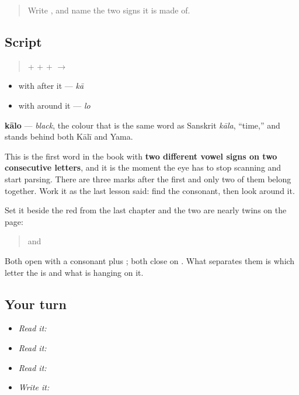 \label{lesson:BN-W03-kalo-read}



\begin{quote}
Write \textbf{}, and name the two signs it is made of.
\end{quote}

\subsection*{Script}
\begin{quote}
\textbf{} + \textbf{} + \textbf{} + \textbf{} $\to$ \textbf{}
\end{quote}

\begin{itemize}
\raggedright
  \item \textbf{} with \textbf{} after it — \emph{kā}
  \item \textbf{} with \textbf{} around it — \emph{lo}
\end{itemize}

\textbf{kālo} — \emph{black}, the colour that is the same word as Sanskrit \emph{kāla}, \textquotedblleft{}time,\textquotedblright{} and stands behind both Kālī and Yama.

This is the first word in the book with \textbf{two different vowel signs on two consecutive letters}, and it is the moment the eye has to stop scanning and start parsing. There are three marks after the first \textbf{} and only two of them belong together. Work it as the last lesson said: find the consonant, then look around it.

Set it beside the red from the last chapter and the two are nearly twins on the page:

\begin{quote}
\textbf{} and \textbf{}
\end{quote}

Both open with a consonant plus \textbf{}; both close on \textbf{}. What separates them is which letter the \textbf{} is and what is hanging on it.

\subsection*{Your turn}
\begin{itemize}
\raggedright
  \item \emph{Read it:} 
  \item \emph{Read it:} 
  \item \emph{Read it:} 
  \item \emph{Write it:} 
\end{itemize}

